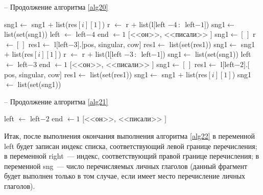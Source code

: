 \documentclass[main]{subfiles}
\begin{document}
\begin{algorithm}
	\caption{-- Продолжение алгоритма \ref{alg20}}\label{alg21}
	\begin{algorithmic}[1]
		\State sng1$\gets$ sng1 $+$ list(res$[i][1]$)
		\State r $\gets$ r $+$ list(l$[$left $-4\, :\, $ left$-1 ]$)
		\EndIf
		\EndFor	
		\State sng1$\gets$ list(set(sng1))
		\State left $\gets$ left$-4$
		\State end $\gets 1$
		\State \Return $[$<<он>>, <<писали>> $]$
		\EndIf
		\EndIf
		\State sng1$\gets [\,]$
		\State r $\gets [\, ]$
		\State res1$\gets$ l$[$left$-3]$.$[$pos, singular, cow$]$
		\State res1$\gets$ list(set(res1))
		\State sng1$\gets$ sng1 $+$ list(res$[i][1]$)
		\State r $\gets$ r $+$ list(l$[$left $-3\, :\, $ left$-1 ]$)
		\EndIf
		\EndFor	
		\State sng1$\gets$ list(set(sng1))
		\State left $\gets$ left$-3$
		\State end $\gets 1$
		\State \Return $[$<<он>>, <<писали>> $]$
		\EndIf
		\EndIf
		\State sng1$\gets [\,]$
		\State res1$\gets$ l$[$left$-2]$.$[$pos, singular, cow$]$
		\State res1$\gets$ list(set(res1))
		\State sng1$\gets$ sng1 $+$ list(res$[i][1]$)
		\EndIf
		\EndFor	
		\State sng1$\gets$ list(set(sng1))
	\end{algorithmic}
\end{algorithm}
\pagebreak
\begin{algorithm}
	\caption{-- Продолжение алгоритма \ref{alg21}}\label{alg22}
	\begin{algorithmic}[1]
				\State left $\gets$ left$-2$
		\State end $\gets 1$
		\State \Return $[$<<он>>, <<писали>> $]$
		\EndIf
		\EndIf
		\EndIf
		\EndWhile
		\EndIf
	\end{algorithmic}
\end{algorithm}
Итак, после выполнения окончания выполнения алгоритма \ref{alg22} в переменной left будет записан индекс списка, соответствующий левой границе перечисления; в переменной right~--- индекс, соответствующий правой границе перечисления; в переменной sng~--- число перечисляемых личных глаголов (данный фрагмент будет выполнен только в том случае, если имеет место перечисление личных глаголов).
\end{document}
